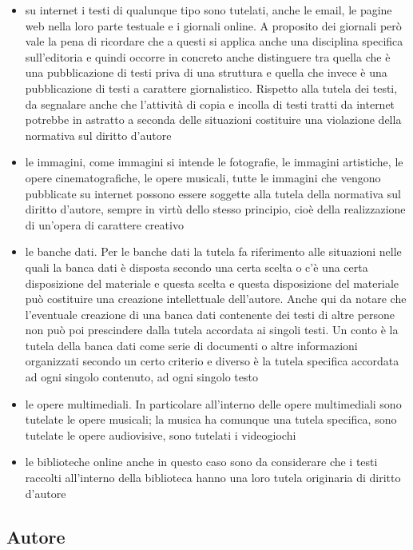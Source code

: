 \begin{itemize}
    \item su internet i testi di qualunque tipo sono tutelati, anche le email, le pagine web nella loro parte testuale e i giornali online. A proposito dei giornali però vale la pena di ricordare che a questi si applica anche una disciplina specifica sull'editoria e quindi occorre in concreto anche distinguere tra quella che è una pubblicazione di testi priva di una struttura e quella che invece è una pubblicazione di testi a carattere giornalistico. Rispetto alla tutela dei testi, da segnalare anche che l'attività di copia e incolla di testi tratti da internet potrebbe in astratto a seconda delle situazioni costituire una violazione della normativa sul diritto d'autore
    \item le immagini, come immagini si intende le fotografie, le immagini artistiche, le opere cinematografiche, le opere musicali, tutte le immagini che vengono pubblicate su internet possono essere soggette alla tutela della normativa sul diritto d'autore, sempre in virtù dello stesso principio, cioè della realizzazione di un'opera di carattere creativo
    \item le banche dati. Per le banche dati la tutela fa riferimento alle situazioni nelle quali la banca dati è disposta secondo una certa scelta o c'è una certa disposizione del materiale e questa scelta e questa disposizione del materiale può costituire una creazione intellettuale dell'autore. Anche qui da notare che l'eventuale creazione di una banca dati contenente dei testi di altre persone non può poi prescindere dalla tutela accordata ai singoli testi. Un conto è la tutela della banca dati come serie di documenti o altre informazioni organizzati secondo un certo criterio e diverso è la tutela specifica accordata ad ogni singolo contenuto, ad ogni singolo testo
    \item le opere multimediali. In particolare all'interno delle opere multimediali sono tutelate le opere musicali; la musica ha comunque una tutela specifica, sono tutelate le opere audiovisive, sono tutelati i videogiochi
    \item le biblioteche online anche in questo caso sono da considerare che i testi raccolti all'interno della biblioteca hanno una loro tutela originaria di diritto d'autore
\end{itemize}

\subsection{Autore}

